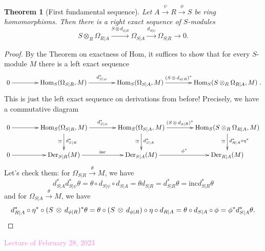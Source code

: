 \documentclass{amsart}[12pt]
\def\Der{\operatorname{Der}}
\newcommand{\Hom}{\mathrm{Hom}}
\newcommand{\Feb}[1]{\textcolor{violet}{Lecture of February #1, 2023}}
\numberwithin{equation}{section}
\theoremstyle{plain} %
\newtheorem{thm}[equation]{Theorem}
\theoremstyle{definition}
\theoremstyle{remark}
\newcommand{\xra}[1]{\xrightarrow{#1}}
\begin{document}
\begin{thm}[First fundamental sequence]
Let $A\xra{\psi} R \xra{\phi} S$ be ring homomorphisms. Then there is a right exact sequence of $S$-modules
\[ S\otimes_R \Omega_{R|A} \xra{S\otimes d_{\phi|R} } \Omega_{S|A} \xra{d_{S|\psi}} \Omega_{S|R} \to 0.\]
\end{thm}
\begin{proof}
By the Theorem on exactness of Hom, it suffices to show that for every $S$-module $M$ there is a left exact sequence
\[ \xymatrix@C=4em{ 0 \ar[r] & \Hom_S(\Omega_{S|R},M) \ar[r]^{d_{S|\psi}^*} & \Hom_S(\Omega_{S|A},M) \ar[r]^-{(S\,\otimes\, d_{\phi|R})^*} & \Hom_S(S\otimes_R \Omega_{R|A},M)}. \]
This is just the left exact sequence on derivations from before! Precisely, we have a commutative diagram
\[ \xymatrix@C=4em{ 0 \ar[r] & \Hom_S(\Omega_{S|R},M) \ar[r]^{d_{S|\psi}^*} \ar[d]^{d_{S|R}^*}_\cong & \Hom_S(\Omega_{S|A},M) \ar[r]^-{(S\,\otimes \,d_{\phi|R})^*}   \ar[d]^{d_{S|A}^*}_\cong& \Hom_S(S\otimes_R \Omega_{R|A},M)  \ar[d]^{d_{R|A}^* \circ \eta^*}_\cong  \\
0\ar[r] & \Der_{S|R}(M) \ar[r]^{\mathrm{inc}} & \Der_{S|A}(M) \ar[r]^{\phi^*} & \Der_{R|A}(M)
} \]
Let's check them: for $\Omega_{S|R} \xra{\theta} M$, we have 
\[ d_{S|A}^* d_{S|\psi}^* \theta = \theta \circ d_{S|\psi} \circ d_{S|A} = \theta d_{S|R} = d_{S|R}^* \theta = \mathrm{inc} d_{S|R}^* \theta\]
and for $\Omega_{S|A} \xra{\theta} M$, we have
\[ d_{R|A}^* \circ \eta^* \circ (S\,\otimes \,d_{\phi|R})^* \theta = \theta \circ (S\,\otimes \,d_{\phi|R}) \circ \eta \circ d_{R|A} = \theta \circ d_{S|A} \circ\phi = \phi^* d_{S|A}^* \theta.\qedhere\]
\end{proof}



\Feb{28}
\end{document}
